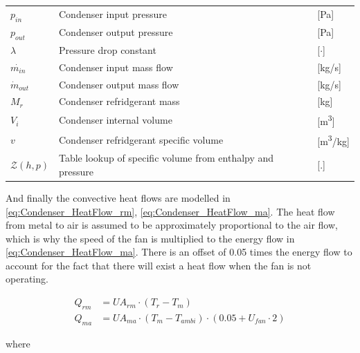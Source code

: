 \begin{center}
	\begin{tabular}{l p{8cm} l}
		$p_{in}$           & Condenser input pressure                                   & [\si{Pa}]          \\
		$p_{out}$          & Condenser output pressure                                  & [\si{Pa}]          \\
		$\lambda$          & Pressure drop constant                                     & [$\cdot$]          \\
		$\dot{m_{in}}$     & Condenser input mass flow                                  & [\si{kg}/\si{s}]   \\
		$\dot{m}_{out}$    & Condenser output mass flow                                 & [\si{kg}/\si{s}]   \\
		$M_{r}$            & Condenser refridgerant mass                                & [\si{kg}]          \\
		$V_{i}$            & Condenser internal volume                                  & [\si{m^3}]         \\
		$v$                & Condenser refridgerant specific volume                     & [\si{m^3}/\si{kg}] \\
		$\mathcal{Z}(h,p)$ & Table lookup of specific volume from enthalpy and pressure & [.]
	\end{tabular}
\end{center}


And finally the convective heat flows are modelled in \cref{eq:Condenser_HeatFlow_rm}, \cref{eq:Condenser_HeatFlow_ma}. The heat flow from metal to air is assumed to be approximately proportional to the air flow, which is why the speed of the fan is multiplied to the energy flow in \cref{eq:Condenser_HeatFlow_ma}. There is an offset of 0.05 times the energy flow to account for the fact that there will exist a heat flow when the fan is not operating.

\begin{align}
	Q_{rm}	 			& = U A_{rm} \cdot (T_r - T_m)							\label{eq:Condenser_HeatFlow_rm}\\
	Q_{ma}	 			& = U A_{ma} \cdot (T_m - T_{ambi})\cdot (0.05 + U_{fan} \cdot 2)				\label{eq:Condenser_HeatFlow_ma}
\end{align}

where

